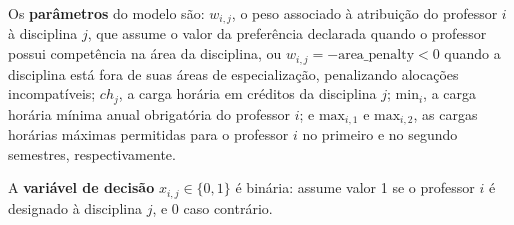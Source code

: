 Os \textbf{parâmetros} do modelo são: $w_{i,j}$, o peso associado à atribuição do professor $i$ à disciplina $j$, que assume o valor da preferência declarada quando o professor possui competência na área da disciplina, ou $w_{i,j} = -\text{area\_penalty} < 0$ quando a disciplina está fora de suas áreas de especialização, penalizando alocações incompatíveis; $ch_j$, a carga horária em créditos da disciplina $j$; $\text{min}_i$, a carga horária mínima anual obrigatória do professor $i$; e $\text{max}_{i,1}$ e $\text{max}_{i,2}$, as cargas horárias máximas permitidas para o professor $i$ no primeiro e no segundo semestres, respectivamente.

A \textbf{variável de decisão} $x_{i,j} \in \{0,1\}$ é binária: assume valor 1 se o professor $i$ é designado à disciplina $j$, e 0 caso contrário.

